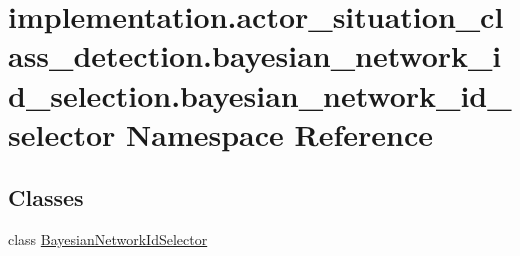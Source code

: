 \hypertarget{namespaceimplementation_1_1actor__situation__class__detection_1_1bayesian__network__id__selectiof39fea08d6bf5e12f9f85b2871294e54}{}\section{implementation.\+actor\+\_\+situation\+\_\+class\+\_\+detection.\+bayesian\+\_\+network\+\_\+id\+\_\+selection.\+bayesian\+\_\+network\+\_\+id\+\_\+selector Namespace Reference}
\label{namespaceimplementation_1_1actor__situation__class__detection_1_1bayesian__network__id__selectiof39fea08d6bf5e12f9f85b2871294e54}
\subsection*{Classes}
\begin{DoxyCompactItemize}
\item 
class \hyperlink{classimplementation_1_1actor__situation__class__detection_1_1bayesian__network__id__selection_1_40d4bcf4976295a8eb746907b1105fdb}{Bayesian\+Network\+Id\+Selector}
\end{DoxyCompactItemize}
